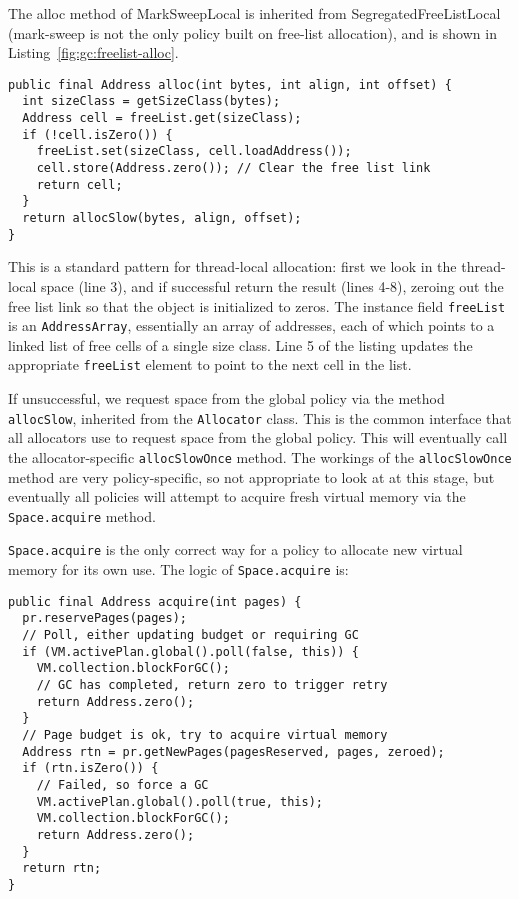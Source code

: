 The alloc method of MarkSweepLocal is inherited from SegregatedFreeListLocal 
(mark-sweep is not the only policy built on free-list allocation), and is shown
in Listing~\ref{fig:gc:freelist-alloc}.
\begin{lstlisting}[name=SegregatedFreeListLocal.java,
caption=\lstname: definition of the alloc method.,label=fig:gc:freelist-alloc]
public final Address alloc(int bytes, int align, int offset) { 
  int sizeClass = getSizeClass(bytes);
  Address cell = freeList.get(sizeClass);
  if (!cell.isZero()) {
    freeList.set(sizeClass, cell.loadAddress());
    cell.store(Address.zero()); // Clear the free list link
    return cell;
  }
  return allocSlow(bytes, align, offset);
}
\end{lstlisting}
This is a standard pattern for thread-local allocation: 
first we look in the thread-local space (line 3), 
and if successful return the result (lines 4-8), zeroing out the free list link
so that the object is initialized to zeros.
The instance field \lstinline|freeList| is an \lstinline|AddressArray|,
essentially an array of addresses, each of which points to a linked list of
free cells of a single size class.  Line 5 of the listing updates the
appropriate \lstinline|freeList| element to point to the next cell in the list.

If unsuccessful, we request space from the global policy via the method
\lstinline|allocSlow|, inherited from the \lstinline|Allocator| class.
This is the common interface that all allocators use to request space from the global policy.  
This will eventually call the allocator-specific \lstinline|allocSlowOnce|
method.
The workings of the \lstinline|allocSlowOnce| method are very policy-specific, 
so not appropriate to look at at this stage, but eventually all policies will 
attempt to acquire fresh virtual memory via the \lstinline|Space.acquire|
method.

\lstinline|Space.acquire| is the only correct way for a policy to allocate new
virtual memory for its own use.  The logic of \lstinline|Space.acquire| is:
\begin{lstlisting}[name=Space.java,caption=\lstname: acquiring new
pages.,label=fig:gc:space-acquire]
public final Address acquire(int pages) {
  pr.reservePages(pages);
  // Poll, either updating budget or requiring GC
  if (VM.activePlan.global().poll(false, this)) {
    VM.collection.blockForGC();
    // GC has completed, return zero to trigger retry
    return Address.zero(); 
  }
  // Page budget is ok, try to acquire virtual memory
  Address rtn = pr.getNewPages(pagesReserved, pages, zeroed);
  if (rtn.isZero()) {  
    // Failed, so force a GC
    VM.activePlan.global().poll(true, this);
    VM.collection.blockForGC();
    return Address.zero();
  }
  return rtn;
}
\end{lstlisting}

